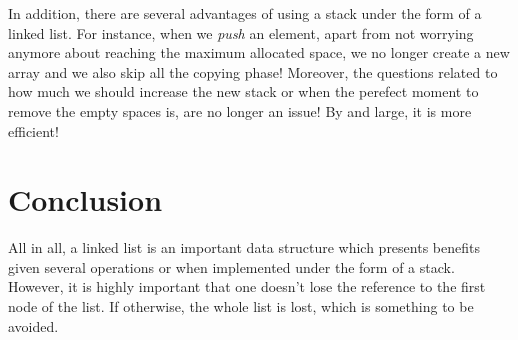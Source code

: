 \documentclass[a4paper,11pt]{article}
\begin{document}
In addition, there are several advantages of using a stack under the form of a linked list. 
For instance, when we \textit{push} an element, apart from not worrying anymore about reaching the maximum allocated space, we no longer create a new
array and we also skip all the copying phase! Moreover, the questions related to how much we should increase the new 
stack or when the perefect moment to remove the empty spaces is, are no longer an issue! By and large, it is more efficient!  


\section*{Conclusion}

All in all, a linked list is an important data structure which presents benefits given several operations or 
when implemented under the form of a stack. However, it is highly important that one
doesn't lose the reference to the first node of the list. If otherwise, the whole list is lost, which is something to be avoided. 
\end{document}
